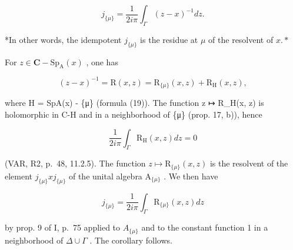 \[
j _ {\{\mu \}} = \frac {1}{2 i \pi} \int_ {\Gamma} (z - x) ^ {- 1} d z.
\]

*In other words, the idempotent \(j_{\{\mu\}}\) is the residue at \(\mu\) of the resolvent of \(x.*\)

For \(z\in \mathbf{C} - \mathrm{Sp}_{\mathrm{A}}(x)\) , one has

\[
(z - x) ^ {- 1} = \mathrm{R} (x, z) = \mathrm{R} _ {\{\mu \}} (x, z) + \mathrm{R} _ {\mathrm{H}} (x, z),
\]

where H = SpA(x) - \{μ\} (formula (19)). The function z ↦ R\_H(x, z) is holomorphic in C-H and in a neighborhood of \{μ\} (prop. 17, b)), hence

\[
\frac {1}{2 i \pi} \int_ {\Gamma} \mathrm{R} _ {\mathrm{H}} (x, z) d z = 0
\]

(VAR, R2, p.~48, 11.2.5). The function \(z \mapsto \mathrm{R}_{\{\mu\}}(x,z)\) is the resolvent of the element \(j_{\{\mu\}}xj_{\{\mu\}}\) of the unital algebra \(\mathrm{A}_{\{\mu\}}\) . We then have

\[
j _ {\{\mu \}} = \frac {1}{2 i \pi} \int_ {\Gamma} \mathrm{R} _ {\{\mu \}} (x, z) d z
\]

by prop. 9 of I, p.~75 applied to \(A_{\{\mu\}}\) and to the constant function 1 in a neighborhood of \(\Delta \cup \Gamma\) . The corollary follows.


